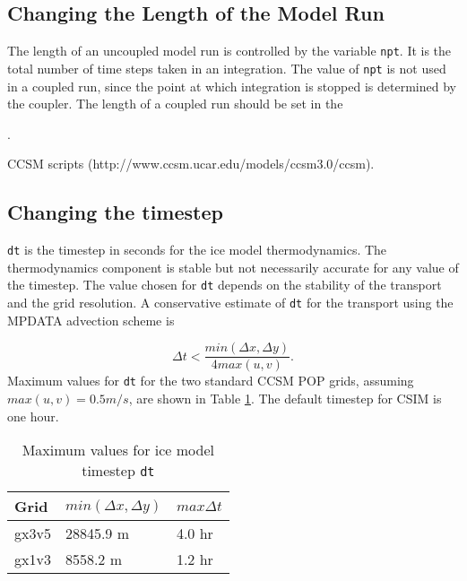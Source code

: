 \subsection{Changing the Length of the Model Run}

The length of an uncoupled model run is controlled by the variable {\tt npt}.
It is the total number of time steps taken in an integration.  The value
of {\tt npt} is not used in a coupled run, since the point at which integration
is stopped is determined by the coupler.  The length of a coupled run should be
set in the 
\begin{htmlonly}
  .
\end{htmlonly}
\begin{htmlonly}
  CCSM scripts (http://www.ccsm.ucar.edu/models/ccsm3.0/ccsm).
\end{htmlonly}

\subsection{Changing the timestep}
\label{nml_time_mgmt}

{\tt dt} is the timestep in seconds for the ice model thermodynamics.
The thermodynamics component is stable but not necessarily accurate for any value
of the timestep.  The value chosen for {\tt dt} depends on the stability of the
transport and the grid resolution.  A conservative estimate of {\tt dt} for the
transport using the MPDATA advection scheme is

\begin{equation}
  \Delta t < \frac{min(\Delta x, \Delta y)}{4 max(u, v)} .
\end{equation}
Maximum values for {\tt dt} for the two standard CCSM POP grids, assuming 
$max(u,v) = 0.5 m/s$, are shown in Table \ref{table:max_dt}.  The default
timestep for CSIM is one hour.

\begin{table}
  \begin{center}
  \caption{Maximum values for ice model timestep {\tt dt}}
  \label{table:max_dt}
  \begin{tabular}{lll} \hline
  Grid & $min(\Delta x, \Delta y)$ & $max \Delta t$   \\
  \hline \hline

gx3v5   & 28845.9 m & 4.0 hr \\
gx1v3   &  8558.2 m & 1.2 hr \\

  \hline
  \end{tabular}
  \end{center}
\end{table}

